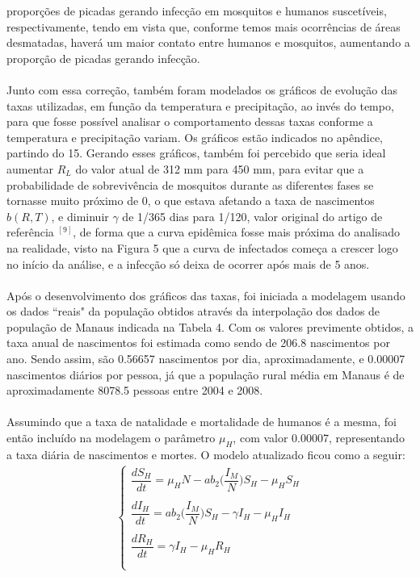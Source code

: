 \documentclass[12pt]{article}
\begin{document}
proporções de picadas gerando infecção em mosquitos e humanos suscetíveis, 
respectivamente, tendo em vista que, conforme temos mais ocorrências de áreas 
desmatadas, haverá um maior contato entre humanos e mosquitos, aumentando a 
proporção de picadas gerando infecção. 
\\\\
Junto com essa correção, também 
foram modelados os gráficos de evolução das taxas utilizadas, em função 
da temperatura e precipitação, ao invés do tempo, para que fosse 
possível analisar o comportamento dessas taxas conforme a temperatura e 
precipitação variam. Os gráficos estão indicados no apêndice, partindo do 15. 
Gerando esses gráficos, também foi percebido que seria ideal aumentar $R_L$ 
do valor atual de 312 mm para 450 mm, para evitar que a probabilidade de 
sobrevivência de mosquitos durante as diferentes fases se 
tornasse muito próximo de 0, o que estava afetando a taxa de 
nascimentos $b(R,T)$, e diminuir $\gamma$ de 1/365 dias para 1/120, valor original
do artigo de referência $^{[9]}$, de forma que a curva epidêmica fosse mais
próxima do analisado na realidade, visto na Figura 5 que a curva de infectados começa
a crescer logo no início da análise, e a infecção só deixa de ocorrer após mais de
5 anos.
\\\\
Após o desenvolvimento dos gráficos das taxas, foi iniciada a modelagem usando os dados 
``reais" da população obtidos através da interpolação dos dados de população de Manaus indicada na Tabela 4.
Com os valores previmente obtidos, a taxa anual de nascimentos foi estimada como sendo de 206.8 
nascimentos por ano. Sendo assim, são 0.56657 nascimentos por dia, aproximadamente, e 0.00007 nascimentos
diários por pessoa, já que a população rural média em Manaus é de aproximadamente 8078.5 pessoas entre 2004 e 2008.
\\\\
Assumindo que a taxa de natalidade e mortalidade de humanos é a mesma, foi então incluído na 
modelagem o parâmetro $\mu_H$, com valor 0.00007, representando a taxa diária de 
nascimentos e mortes. O modelo atualizado ficou como a seguir:
\begin{gather*}
\begin{cases}
\dfrac{dS_H}{dt} = \mu_HN-ab_2\bigg(\dfrac{I_M}{N}\bigg)S_H - \mu_HS_H\\
\\
\dfrac{dI_H}{dt} = ab_2\bigg(\dfrac{I_M}{N}\bigg)S_H-\gamma I_H - \mu_HI_H\\
\\
\dfrac{dR_H}{dt} = \gamma I_H - \mu_HR_H\\
\\
\end{cases}
\end{gather*}
\end{document}
